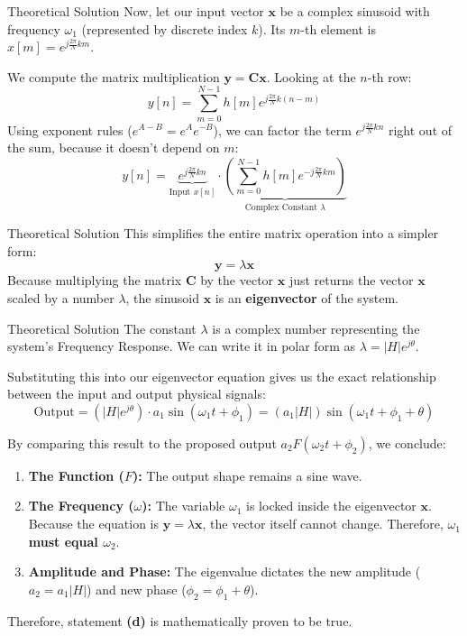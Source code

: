 \documentclass{beamer}
\begin{document}
\begin{frame}{Theoretical Solution}
Now, let our input vector $\mathbf{x}$ be a complex sinusoid with frequency $\omega_1$ (represented by discrete index $k$). Its $m$-th element is $x[m] = e^{j\frac{2\pi}{N}km}$.

We compute the matrix multiplication $\mathbf{y} = \mathbf{C}\mathbf{x}$. Looking at the $n$-th row:
\begin{equation}
y[n] = \sum_{m=0}^{N-1} h[m] e^{j\frac{2\pi}{N}k(n-m)}
\end{equation}
Using exponent rules ($e^{A-B} = e^A e^{-B}$), we can factor the term $e^{j\frac{2\pi}{N}kn}$ right out of the sum, because it doesn't depend on $m$:
\begin{equation}
y[n] = \underbrace{e^{j\frac{2\pi}{N}kn}}_{\text{Input } x[n]} \cdot \underbrace{\left( \sum_{m=0}^{N-1} h[m] e^{-j\frac{2\pi}{N}km} \right)}_{\text{Complex Constant } \lambda}
\end{equation}

\end{frame}
\begin{frame}{Theoretical Solution}
This simplifies the entire matrix operation into a simpler form:
\begin{equation}
\mathbf{y} = \lambda \mathbf{x}
\end{equation}
Because multiplying the matrix $\mathbf{C}$ by the vector $\mathbf{x}$ just returns the vector $\mathbf{x}$ scaled by a number $\lambda$, the sinusoid $\mathbf{x}$ is an \textbf{eigenvector} of the system.
\end{frame}
\begin{frame}{Theoretical Solution}
The constant $\lambda$ is a complex number representing the system's Frequency Response. We can write it in polar form as $\lambda = |H|e^{j\theta}$.

Substituting this into our eigenvector equation gives us the exact relationship between the input and output physical signals:
\begin{equation}
\text{Output} = \left(|H|e^{j\theta}\right) \cdot a_1 \sin(\omega_1 t + \phi_1) = (a_1 |H|) \sin(\omega_1 t + \phi_1 + \theta)
\end{equation}

By comparing this result to the proposed output $a_2 F(\omega_2 t + \phi_2)$, we conclude:
\begin{enumerate}
    \item \textbf{The Function ($F$):} The output shape remains a sine wave. 
    \item \textbf{The Frequency ($\omega$):} The variable $\omega_1$ is locked inside the eigenvector $\mathbf{x}$. Because the equation is $\mathbf{y} = \lambda \mathbf{x}$, the vector itself cannot change. Therefore, \textbf{$\omega_1$ must equal $\omega_2$}.
    \item \textbf{Amplitude and Phase:} The eigenvalue dictates the new amplitude ($a_2 = a_1 |H|$) and new phase ($\phi_2 = \phi_1 + \theta$).
\end{enumerate}
Therefore, statement \textbf{(d)} is mathematically proven to be true.
\end{frame}
\end{document}
